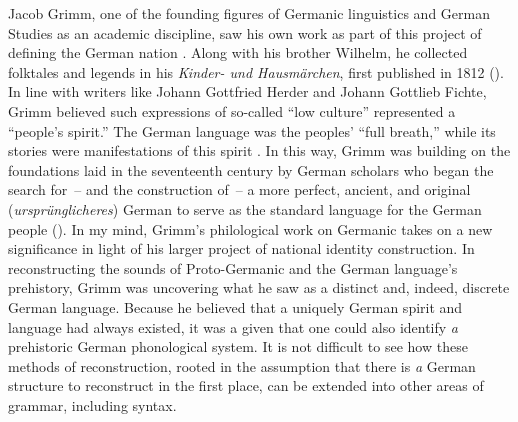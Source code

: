 Jacob Grimm, one of the founding figures of Germanic linguistics and German Studies as an academic discipline, saw his own work as part of this project of defining the German nation \citep[188--189]{Krebs2011}. Along with his brother Wilhelm, he collected folktales and legends in his \textit{Kinder- und Hausmärchen}, first published in 1812 (\cite{Grimm1812}). In line with writers like Johann Gottfried Herder and Johann Gottlieb Fichte, Grimm believed such expressions of so-called “low culture” represented a “people’s spirit.” The German language was the peoples’ “full breath,” while its stories were manifestations of this spirit \citep[189]{Krebs2011}. In this way, Grimm was building on the foundations laid in the seventeenth century by German scholars who began the search for~-- and the construction of~-- a more perfect, ancient, and original (\textit{ursprünglicheres}) German to serve as the standard language for the German people (\citealt{Langer2000,Langer2002}). In my mind, Grimm’s philological work on Germanic takes on a new significance in light of his larger project of national identity construction. In reconstructing the sounds of Proto-Germanic and the German language’s prehistory, Grimm was uncovering what he saw as a distinct and, indeed, discrete German language. Because he believed that a uniquely German spirit and language had always existed, it was a given that one could also identify \textit{a} prehistoric German phonological system. It is not difficult to see how these methods of reconstruction, rooted in the assumption that there is \textit{a} German structure to reconstruct in the first place, can be extended into other areas of grammar, including syntax. 

